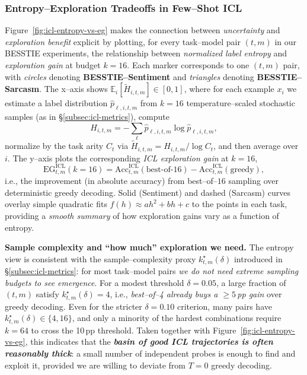 \clearpage
\newpage

\subsubsection{Entropy--Exploration Tradeoffs in Few--Shot ICL}
\label{subsec:icl-entropy-eg}

Figure~\ref{fig:icl-entropy-vs-eg} makes the connection between
\emph{uncertainty} and \emph{exploration benefit} explicit by plotting,
for every task--model pair $(t,m)$ in our BESSTIE experiments, the
relationship between \emph{normalized label entropy} and
\emph{exploration gain} at budget $k{=}16$.  Each marker corresponds to
one $(t,m)$ pair, with \emph{circles} denoting
\textbf{BESSTIE--Sentiment} and \emph{triangles} denoting
\textbf{BESSTIE--Sarcasm}.  The x--axis shows
$\mathbb{E}_i[\widetilde{H}_{i,t,m}] \in [0,1]$, where for each example
$x_i$ we estimate a label distribution
$\hat{p}_{\ell,i,t,m}$ from $k{=}16$ temperature--scaled stochastic
samples (as in \S\ref{subsec:icl-metrics}), compute
\[
  H_{i,t,m} = - \sum_{\ell} \hat{p}_{\ell,i,t,m}
                   \log \hat{p}_{\ell,i,t,m},
\]
normalize by the task arity
$C_t$ via $\widetilde{H}_{i,t,m} = H_{i,t,m}/\log C_t$, and then average
over $i$.  The y--axis plots the corresponding
\emph{ICL exploration gain} at $k{=}16$,
\[
  \mathrm{EG}^{\mathrm{ICL}}_{t,m}(k{=}16)
  =
  \mathrm{Acc}^{\mathrm{ICL}}_{t,m}(\text{best-of-}16)
  -
  \mathrm{Acc}^{\mathrm{ICL}}_{t,m}(\text{greedy}),
\]
i.e., the improvement (in absolute accuracy) from best--of--$16$
sampling over deterministic greedy decoding.  Solid (Sentiment) and
dashed (Sarcasm) curves overlay simple quadratic fits
$f(h) \approx ah^2 + bh + c$ to the points in each task, providing a
\emph{smooth summary} of how exploration gains vary as a function of
entropy.

\medskip
\noindent
\textbf{Sample complexity and ``how much'' exploration we need.}
The entropy view is consistent with the sample--complexity proxy
$k^{\star}_{t,m}(\delta)$ introduced in
\S\ref{subsec:icl-metrics}: for most task--model pairs \emph{we do not
need extreme sampling budgets to see emergence}.  For a modest threshold
$\delta{=}0.05$, a large fraction of $(t,m)$ satisfy
$k^{\star}_{t,m}(\delta){=}4$, i.e., \emph{best--of--4 already buys a
$\ge 5$\,pp gain} over greedy decoding.  Even for the stricter
$\delta{=}0.10$ criterion, many pairs have
$k^{\star}_{t,m}(\delta)\in\{4,16\}$, and only a minority of the hardest
combinations require $k{=}64$ to cross the 10\,pp threshold.  Taken
together with Figure~\ref{fig:icl-entropy-vs-eg}, this indicates that the
\emph{\textbf{basin of good ICL trajectories is often reasonably thick}}:
a small number of independent probes is enough to find and exploit it,
provided we are willing to deviate from $T{=}0$ greedy decoding.

